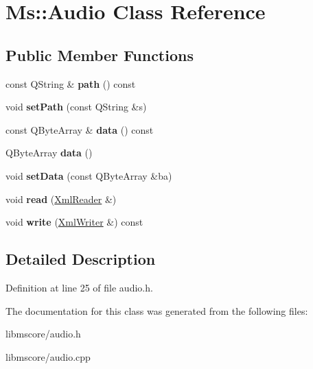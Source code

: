\hypertarget{class_ms_1_1_audio}{}\section{Ms\+:\+:Audio Class Reference}
\label{class_ms_1_1_audio}
\subsection*{Public Member Functions}
\begin{DoxyCompactItemize}
\item 
\mbox{\label{class_ms_1_1_audio_ab0e34be3d0d4e5b4eed6b872747da6f1}} 
const Q\+String \& {\bfseries path} () const
\item 
\mbox{\label{class_ms_1_1_audio_a4f6d2ce16e3f71179602f95a7be2c34f}} 
void {\bfseries set\+Path} (const Q\+String \&s)
\item 
\mbox{\label{class_ms_1_1_audio_a95fe6f4cab9b4af5331350389a63c029}} 
const Q\+Byte\+Array \& {\bfseries data} () const
\item 
\mbox{\label{class_ms_1_1_audio_aa1fc9e9fd664127a0efe34c3b47bfa81}} 
Q\+Byte\+Array {\bfseries data} ()
\item 
\mbox{\label{class_ms_1_1_audio_ab0a879e6c93325268cfbd8dc94b9f692}} 
void {\bfseries set\+Data} (const Q\+Byte\+Array \&ba)
\item 
\mbox{\label{class_ms_1_1_audio_a37e58e7097e1085128c61fa21add2f56}} 
void {\bfseries read} (\hyperlink{class_ms_1_1_xml_reader}{Xml\+Reader} \&)
\item 
\mbox{\label{class_ms_1_1_audio_a6b399513734878635944f0bb053fa629}} 
void {\bfseries write} (\hyperlink{class_ms_1_1_xml_writer}{Xml\+Writer} \&) const
\end{DoxyCompactItemize}


\subsection{Detailed Description}


Definition at line 25 of file audio.\+h.



The documentation for this class was generated from the following files\+:\begin{DoxyCompactItemize}
\item 
libmscore/audio.\+h\item 
libmscore/audio.\+cpp\end{DoxyCompactItemize}
